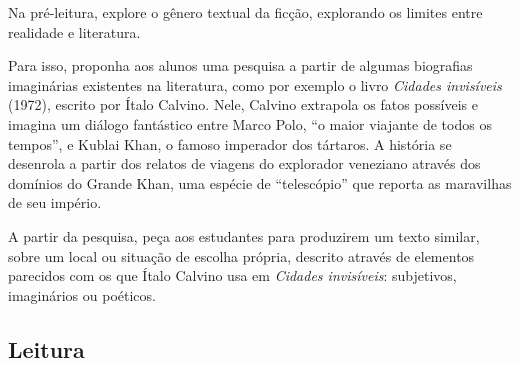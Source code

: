 \documentclass[12pt]{extarticle}
\begin{document}
Na pré-leitura, explore o gênero textual da ficção, explorando
os limites entre realidade e literatura.
 
Para isso, proponha aos alunos uma pesquisa a partir de algumas biografias
imaginárias existentes na literatura, como por exemplo o livro \emph{Cidades invisíveis} 
(1972), escrito por Ítalo Calvino. Nele, Calvino extrapola os fatos possíveis 
e imagina um diálogo fantástico entre Marco Polo, ``o maior viajante de todos os tempos'', 
e Kublai Khan, o famoso imperador dos tártaros. A história se desenrola a partir 
dos relatos de viagens do explorador veneziano através dos domínios do 
Grande Khan, uma espécie de ``telescópio'' que reporta as maravilhas de seu império.



A partir da pesquisa, peça aos estudantes para produzirem um texto similar, 
sobre um local ou situação de escolha própria, descrito 
através de elementos parecidos com os que Ítalo Calvino usa 
em \emph{Cidades invisíveis}: subjetivos, imaginários ou poéticos.

\subsection{Leitura}
\end{document}
